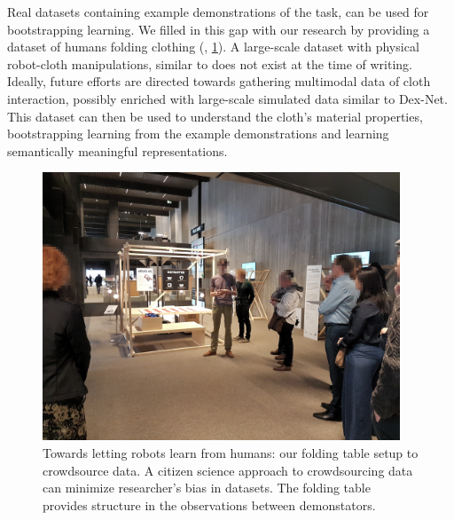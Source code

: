 \documentclass[\home/main.tex]{subfiles}
\begin{document}
Real datasets containing example demonstrations of the task, can be used for bootstrapping learning. We filled in this gap with our research by providing a dataset of humans folding clothing (\autocite{Verleysen2020-dataset}, \cref{fig:towards_douglas}). A large-scale dataset with physical robot-cloth manipulations, similar to \autocite{Levine2016} does not exist at the time of writing. Ideally, future efforts are directed towards gathering multimodal data of cloth interaction, possibly enriched with large-scale simulated data similar to Dex-Net. This dataset can then be used to understand the cloth's material properties, bootstrapping learning from the example demonstrations and learning semantically meaningful representations.

\begin{figure}[htpb]
    \centering
    \includegraphics[width=0.95\textwidth, keepaspectratio]{figures/datasets_3_defaced.jpg}
    \caption[An example for crowdsourcing data for robotics research.]{Towards letting robots learn from humans: our folding table setup to crowdsource data. A citizen science approach to crowdsourcing data can minimize researcher's bias in datasets. The folding table provides structure in the observations between demonstators.}
    \label{fig:towards_douglas}
\end{figure}
\end{document}
